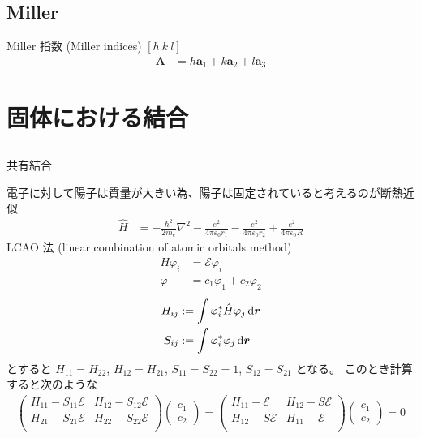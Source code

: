 \documentclass[uplatex,dvipdfmx,a4paper,11pt]{jlreq}
\newcommand{\rr}{\bm{r}}
\renewcommand{\aa}{\bm{a}}
\numberwithin{equation}{section}
\theoremstyle{definition}
\begin{document}
\subsection{Miller}
Miller 指数 (Miller indices)
$[h\ k\ l]$
\begin{align}
  \bm{A} & = h\aa_1 + k\aa_2 + l\aa_3
\end{align}



\section{固体における結合}
\subsection{}
共有結合

電子に対して陽子は質量が大きい為、陽子は固定されていると考えるのが断熱近似
\begin{align}
  \hat{H} & = -\frac{\hbar^2}{2m_e}\nabla^2 - \frac{e^2}{4\pi\varepsilon_0r_1} - \frac{e^2}{4\pi\varepsilon_0r_2} + \frac{e^2}{4\pi\varepsilon_0R}
\end{align}
LCAO 法 (linear combination of atomic orbitals method)
\begin{align}
  H\varphi_i & = \mathcal{E}\varphi_i        \\
  \varphi    & = c_1\varphi_1 + c_2\varphi_2
\end{align}
\begin{align}
  H_{ij} & := \int\varphi_i^*\hat{H}\varphi_j\dl{\rr} \\
  S_{ij} & := \int\varphi_i^*\varphi_j\dl{\rr}
\end{align}
とすると $H_{11} = H_{22}$, $H_{12} = H_{21}$, $S_{11} = S_{22} = 1$, $S_{12} = S_{21}$ となる。
このとき計算すると次のような
\begin{align}
  \begin{pmatrix}
    H_{11} - S_{11}\mathcal{E} & H_{12} - S_{12}\mathcal{E} \\
    H_{21} - S_{21}\mathcal{E} & H_{22} - S_{22}\mathcal{E} \\
  \end{pmatrix}
  \begin{pmatrix}
    c_1 \\ c_2
  \end{pmatrix}
  =
  \begin{pmatrix}
    H_{11} - \mathcal{E}  & H_{12} - S\mathcal{E} \\
    H_{12} - S\mathcal{E} & H_{11} - \mathcal{E}  \\
  \end{pmatrix}
  \begin{pmatrix}
    c_1 \\ c_2
  \end{pmatrix}
  = 0
\end{align}
\end{document}
